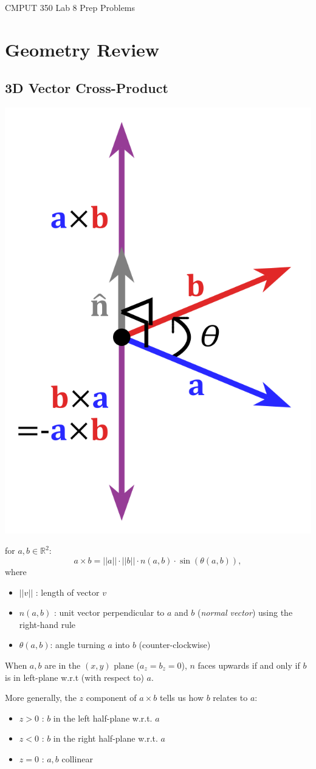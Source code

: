 \documentclass[a4paper,11pt]{article}
\begin{document}

\begin{center}
{\Large CMPUT 350 Lab 8 Prep Problems}
\end{center}


\linerule


\section*{Geometry Review}
\subsection*{3D Vector Cross-Product}
\centerline{\includegraphics[width=0.3\linewidth]{crossprod.png}}

for $a, b \in \mathbb{R}^2$:
\[ a \times b = || a || \cdot || b || \cdot n (a, b) \cdot \sin\left( \theta(a, b)  \right), \]
where 
\begin{itemize}
    \item $||v||$ : length of vector $v$
    \item $n(a,b)$ : unit vector perpendicular to $a$ and $b$ (\textit{normal vector}) using the right-hand rule 
    \item $\theta(a, b)$: angle turning $a$ into $b$ (counter-clockwise)
\end{itemize}

When $a, b$ are in the $(x, y)$ plane ($a_z = b_z = 0$), $n$ faces upwards if and only if 
$b$ is in left-plane w.r.t (with respect to) $a$.

\medbreak 

More generally, the $z$ component of $a \times b$ tells us how $b$ relates to $a$:
\begin{itemize}
    \item $z > 0$ : $b$ in the left half-plane w.r.t. $a$
    \item $z < 0$ : $b$ in the right half-plane w.r.t. $a$
    \item $z = 0$ : $a, b$ collinear
\end{itemize}
\end{document}
